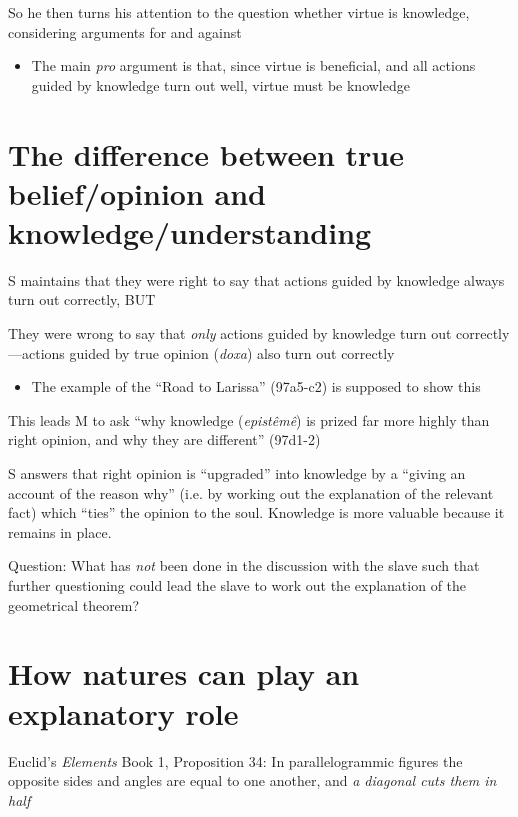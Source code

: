 \documentclass[11pt]{article}
\begin{document}
\noindent So he then turns his attention to the question whether virtue is knowledge, considering arguments for and against
\begin{itemize}\item{The main \emph{pro} argument is that, since virtue is beneficial, and all actions guided by knowledge turn out well, virtue must be knowledge}\end{itemize}

\section*{The difference between true belief/opinion and knowledge/understanding}

\noindent S maintains that they were right to say that actions guided by knowledge always turn out correctly, BUT
\vspace*{2mm}

\noindent They were wrong to say that \emph{only} actions guided by knowledge turn out correctly---actions guided by true opinion (\emph{doxa}) also turn out correctly

\begin{itemize}\item{The example of the ``Road to Larissa'' (97a5-c2) is supposed to show this}\end{itemize}

\noindent This leads M to ask ``why knowledge (\emph{epist\^{e}m\^{e}}) is prized far more highly than right opinion, and why they are different'' (97d1-2)
\vspace*{2mm}

\noindent S answers that right opinion is ``upgraded'' into knowledge by a ``giving an account of the reason why'' (i.e. by working out the explanation of the relevant fact) which ``ties'' the opinion to the soul. Knowledge is more valuable because it remains in place.
\vspace*{2mm}

\noindent Question: What has \emph{not} been done in the discussion with the slave such that further questioning could lead the slave to work out the explanation of the geometrical theorem?
\vspace*{2mm}

\section*{How natures can play an explanatory role}

\noindent Euclid's \emph{Elements} Book 1, Proposition 34: In parallelogrammic figures the opposite sides and angles are equal to one another, and \emph{a diagonal cuts them in half}
\vspace*{2mm}
\end{document}
